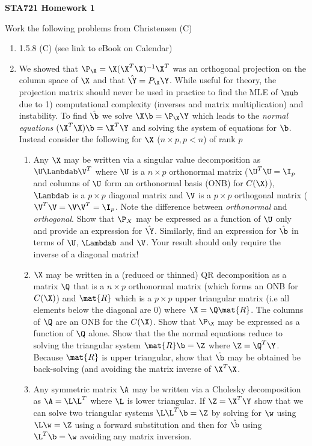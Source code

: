 \documentclass[12pt]{article}
\begin{document}
{\bf STA721 \hfill Homework 1}

\vspace{.5in}
\noindent
Work the following problems from Christensen (C) 
\begin{enumerate}
\item 1.5.8 (C) (see link to eBook on Calendar)

\item We showed that $\P_\X = \X(\X^T\X)^{-1}\X^T$ was an orthogonal
  projection on the column space of $\X$ and that $\hat{\Y} = P_\X \Y$.
  While useful for theory, the projection matrix should never be used
  in practice to find the MLE of $\mub$ due to 1) computational
  complexity (inverses and matrix multiplication) and instability.  To
  find $\hat{\b}$ we solve $\X \b = \P_\X \Y $ which
  leads to the {\it normal equations}  $(\X^T\X) \b = \X^T\Y$ and
  solving the system of equations for $\b$.
  Instead consider the following for $\X$ ($n \times p, p < n$) of rank $p$

  \begin{enumerate}
  \item Any $\X$ may be written via a singular value decomposition as
    $\U \Lambdab \V^T$ where $\U$ is a $n \times p$ orthonormal matrix
    ($\U^T\U = \I_p$ and columns of $\U$ form an orthonormal basis (ONB) for
    $C(\X)$), $\Lambdab$ is a $p \times p$ diagonal matrix and $\V$ is
    a $p \times p$ orthogonal matrix ($\V^T\V = \V \V^T = \I_p$. Note
    the difference between {\it orthonormal} and {\it orthogonal}.
    Show that $\P_X$ may be expressed as a function of $\U$ only and
    provide an expression for $\hat{\Y}$.  Similarly, find an
    expression for $\hat{\b}$ in terms of $\U$, $\Lambdab$ and $\V$.
    Your result should only require the inverse of a diagonal matrix!
\item $\X$ may be written in a (reduced or thinned) QR decomposition as a matrix
  $\Q$ that is a $n \times p$ orthonormal matrix (which forms an ONB
  for $C(\X)$) and $\mat{R}$ which is a $p
  \times p$ upper triangular matrix (i.e all elements below the
  diagonal are 0) where $\X = \Q \mat{R}$. The columns of $\Q$ are an ONB for
  the $C(\X)$. Show that $\P_\X$
  may be expressed as a function of $\Q$ alone.   Show that  the 
 the normal equations reduce to solving the triangular system $\mat{R} \b = \Z$ where $\Z = \Q^T \Y$.
 Because $\mat{R}$ is upper triangular, show that $\hat{\b}$ may be
 obtained be back-solving (and avoiding the matrix inverse of $\X^T\X$.
   
\item Any symmetric matrix $\A$ may be written via a Cholesky
  decomposition as $\A = \L \L^T$ where $\L$
  is lower triangular.   If $\Z = \X^T\Y$  show that we can solve two
  triangular systems $\L \L^T \b = \Z$ by solving for $\w$ using  $\L \w = \Z$ using a
  forward substitution and then for $\hat{\b}$ using $\L^T \b =
  \w$ avoiding any matrix inversion.


\end{enumerate}
\end{enumerate}
\end{document}
